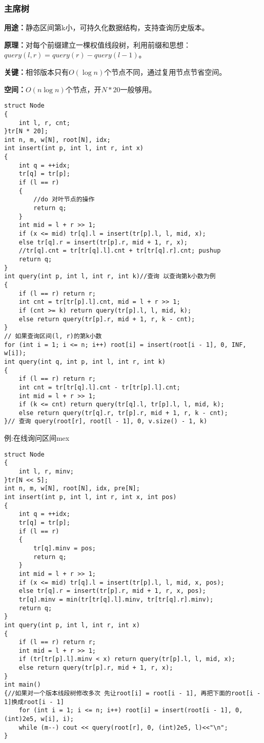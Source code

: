 \documentclass[a4paper,fontset=none]{ctexart}
\begin{document}
\subsubsection{主席树}
\textbf{用途：}静态区间第k小，可持久化数据结构，支持查询历史版本。

\textbf{原理：}对每个前缀建立一棵权值线段树，利用前缀和思想：$query(l,r) = query(r) - query(l-1)$。

\textbf{关键：}相邻版本只有$O(\log n)$个节点不同，通过复用节点节省空间。

\textbf{空间：}$O(n\log n)$个节点，开$N*20$一般够用。
\begin{verbatim}
struct Node
{
    int l, r, cnt;
}tr[N * 20];
int n, m, w[N], root[N], idx;
int insert(int p, int l, int r, int x)
{
    int q = ++idx;
    tr[q] = tr[p];
    if (l == r)
    {
        //do 对叶节点的操作
        return q;
    }
    int mid = l + r >> 1;
    if (x <= mid) tr[q].l = insert(tr[p].l, l, mid, x);
    else tr[q].r = insert(tr[p].r, mid + 1, r, x);
    //tr[q].cnt = tr[tr[q].l].cnt + tr[tr[q].r].cnt; pushup
    return q;
}
int query(int p, int l, int r, int k)//查询 以查询第k小数为例
{
    if (l == r) return r;
    int cnt = tr[tr[p].l].cnt, mid = l + r >> 1;
    if (cnt >= k) return query(tr[p].l, l, mid, k);
    else return query(tr[p].r, mid + 1, r, k - cnt);
}
// 如果查询区间(l, r)的第k小数
for (int i = 1; i <= n; i++) root[i] = insert(root[i - 1], 0, INF, w[i]);
int query(int q, int p, int l, int r, int k)
{
    if (l == r) return r;
    int cnt = tr[tr[q].l].cnt - tr[tr[p].l].cnt;
    int mid = l + r >> 1;
    if (k <= cnt) return query(tr[q].l, tr[p].l, l, mid, k);
    else return query(tr[q].r, tr[p].r, mid + 1, r, k - cnt);
}// 查询 query(root[r], root[l - 1], 0, v.size() - 1, k)
\end{verbatim}

例:在线询问区间mex
\begin{verbatim}
struct Node
{
    int l, r, minv;
}tr[N << 5];
int n, m, w[N], root[N], idx, pre[N];
int insert(int p, int l, int r, int x, int pos)
{
    int q = ++idx;
    tr[q] = tr[p];
    if (l == r)
    {
        tr[q].minv = pos;
        return q;
    }
    int mid = l + r >> 1;
    if (x <= mid) tr[q].l = insert(tr[p].l, l, mid, x, pos);
    else tr[q].r = insert(tr[p].r, mid + 1, r, x, pos);
    tr[q].minv = min(tr[tr[q].l].minv, tr[tr[q].r].minv);
    return q;
}
int query(int p, int l, int r, int x)
{
    if (l == r) return r;
    int mid = l + r >> 1;
    if (tr[tr[p].l].minv < x) return query(tr[p].l, l, mid, x);
    else return query(tr[p].r, mid + 1, r, x);
}
int main()
{//如果对一个版本线段树修改多次 先让root[i] = root[i - 1], 再把下面的root[i - 1]换成root[i - 1]
    for (int i = 1; i <= n; i++) root[i] = insert(root[i - 1], 0, (int)2e5, w[i], i);
    while (m--) cout << query(root[r], 0, (int)2e5, l)<<"\n";
}
\end{verbatim}
\end{document}

